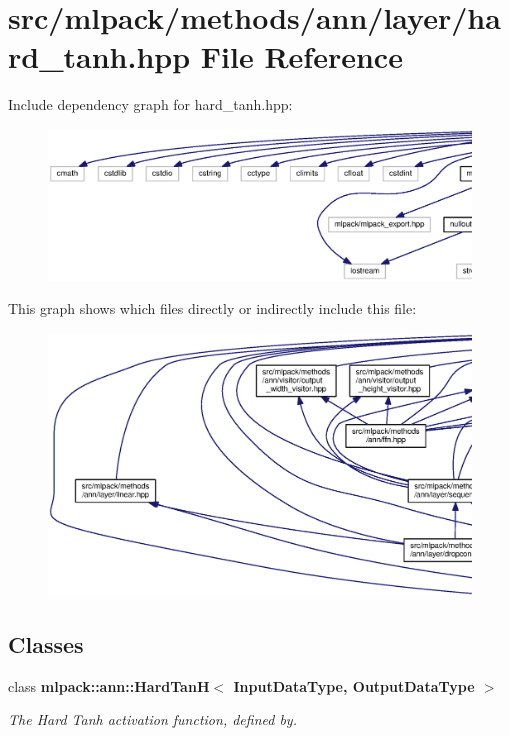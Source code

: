\section{src/mlpack/methods/ann/layer/hard\+\_\+tanh.hpp File Reference}
\label{hard__tanh_8hpp}
Include dependency graph for hard\+\_\+tanh.\+hpp\+:
\nopagebreak
\begin{figure}[H]
\begin{center}
\leavevmode
\includegraphics[width=350pt]{hard__tanh_8hpp__incl}
\end{center}
\end{figure}
This graph shows which files directly or indirectly include this file\+:
\nopagebreak
\begin{figure}[H]
\begin{center}
\leavevmode
\includegraphics[width=350pt]{hard__tanh_8hpp__dep__incl}
\end{center}
\end{figure}
\subsection*{Classes}
\begin{DoxyCompactItemize}
\item 
class {\bf mlpack\+::ann\+::\+Hard\+Tan\+H$<$ Input\+Data\+Type, Output\+Data\+Type $>$}
\begin{DoxyCompactList}\small\item\em The Hard Tanh activation function, defined by. \end{DoxyCompactList}\end{DoxyCompactItemize}
